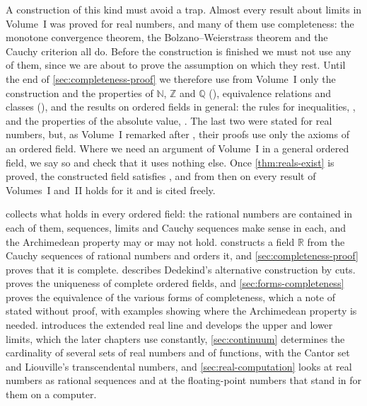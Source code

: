 A construction of this kind must avoid a trap. Almost every result about limits in Volume~I was proved for real numbers, and many of them use completeness: the monotone convergence theorem, the Bolzano--Weierstrass theorem and the Cauchy criterion all do. Before the construction is finished we must not use any of them, since we are about to prove the assumption on which they rest. Until the end of \cref{sec:completeness-proof} we therefore use from Volume~I only the construction and the properties of $\mathbb N$, $\mathbb Z$ and $\mathbb Q$ (), equivalence relations and classes (), and the results on ordered fields in general: the rules for inequalities, , and the properties of the absolute value, . The last two were stated for real numbers, but, as Volume~I remarked after , their proofs use only the axioms of an ordered field. Where we need an argument of Volume~I in a general ordered field, we say so and check that it uses nothing else. Once \cref{thm:reals-exist} is proved, the constructed field satisfies , and from then on every result of Volumes~I and~II holds for it and is cited freely.

 collects what holds in every ordered field: the rational numbers are contained in each of them, sequences, limits and Cauchy sequences make sense in each, and the Archimedean property may or may not hold.  constructs a field $\mathbb R$ from the Cauchy sequences of rational numbers and orders it, and \cref{sec:completeness-proof} proves that it is complete.  describes Dedekind's alternative construction by cuts.  proves the uniqueness of complete ordered fields, and \cref{sec:forms-completeness} proves the equivalence of the various forms of completeness, which a note of  stated without proof, with examples showing where the Archimedean property is needed.  introduces the extended real line and develops the upper and lower limits, which the later chapters use constantly, \cref{sec:continuum} determines the cardinality of several sets of real numbers and of functions, with the Cantor set and Liouville's transcendental numbers, and \cref{sec:real-computation} looks at real numbers as rational sequences and at the floating-point numbers that stand in for them on a computer.

